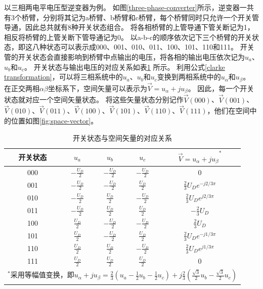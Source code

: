 \documentclass{ctexart}
\numberwithin{equation}{section}
\begin{document}
以三相两电平电压型逆变器为例。
如图\ref{three-phase-converter}所示，逆变器一共有3个桥臂，分别将其记为a桥臂、b桥臂和c桥臂，每个桥臂同时只允许一个开关管导通，因此总共就有8种开关状态组合。
将各相桥臂的上管导通下管关断记为1，相反将桥臂的上管关断下管导通记为0。
以a-b-c的顺序依次记下三个桥臂的开关状态，即这八种状态可以表示成000、001、010、011、100、101、110和111。
开关管的开关状态会直接影响到桥臂中点输出的电压，将各相的输出电压依次记为$u_a$、$u_b$和$u_c$。
开关状态与输出电压的对应关系如表\ref{tab:switch-mode} 所示。
利用公式\ref{clarke transformation}，可以将三相系统中的$u_a$、$u_b$和$u_c$变换到两相系统中的$u_\alpha$和$u_\beta$。
在正交两相$\alpha \beta$坐标系下，空间矢量可以表示为${\vec{V}=u_\alpha + ju_\beta } $。
因此，每一个开关状态就对应一个空间矢量状态。
将这些矢量状态分别记作$\vec V(000)$、$\vec V(001)$、$\vec V(010) $、$\vec V(011) $、$\vec V(100) $、$\vec V(101) $、$\vec V(110) $、$\vec V(111) $，他们在空间中的位置如图\ref{fig:space-vector}。

\begin{table}[htb]
  \centering
  \caption{开关状态与空间矢量的对应关系}
  \label{tab:switch-mode}
  \begin{tabular}{ccccc}
  \toprule
  开关状态 & $u_a$            & $u_b$            & $u_c$            & ${\vec V=u_\alpha + ju_\beta }^\ast $      \\ \midrule
  000  & $-\frac{U_D}{2}$ & $-\frac{U_D}{2}$ & $-\frac{U_D}{2}$ & 0                            \\
  001  & $-\frac{U_D}{2}$ & $-\frac{U_D}{2}$ & $\frac{U_D}{2}$  & $\frac{2}{3}U_De^{-j2/3\pi}$ \\
  010  & $-\frac{U_D}{2}$ & $\frac{U_D}{2}$  & $-\frac{U_D}{2}$ & $\frac{2}{3}U_De^{j2/3\pi}$  \\
  011  & $-\frac{U_D}{2}$ & $\frac{U_D}{2}$  & $\frac{U_D}{2}$  & $-\frac{2}{3}U_D$            \\
  100  & $\frac{U_D}{2}$  & $-\frac{U_D}{2}$ & $-\frac{U_D}{2}$ & $\frac{2}{3}U_D$             \\
  101  & $\frac{U_D}{2}$  & $-\frac{U_D}{2}$ & $\frac{U_D}{2}$  & $\frac{2}{3}U_De^{-j1/3\pi}$ \\
  110  & $\frac{U_D}{2}$  & $\frac{U_D}{2}$  & $-\frac{U_D}{2}$ & $\frac{2}{3}U_De^{j1/3\pi}$  \\
  111  & $\frac{U_D}{2}$  & $\frac{U_D}{2}$  & $\frac{U_D}{2}$  & 0\\ \bottomrule
  \multicolumn{5}{l}{\footnotesize{${^{\ast}}$采用等幅值变换，即$u_\alpha + ju_\beta = \frac{2}{3}{(u_a-\frac{1}{2}u_b-\frac{1}{2}u_c)}+j\frac{2}{3}(\frac{\sqrt{3}}{2}u_b-\frac{\sqrt{3}}{2}u_c)$ }}                          
  \end{tabular}
\end{table}
\end{document}
